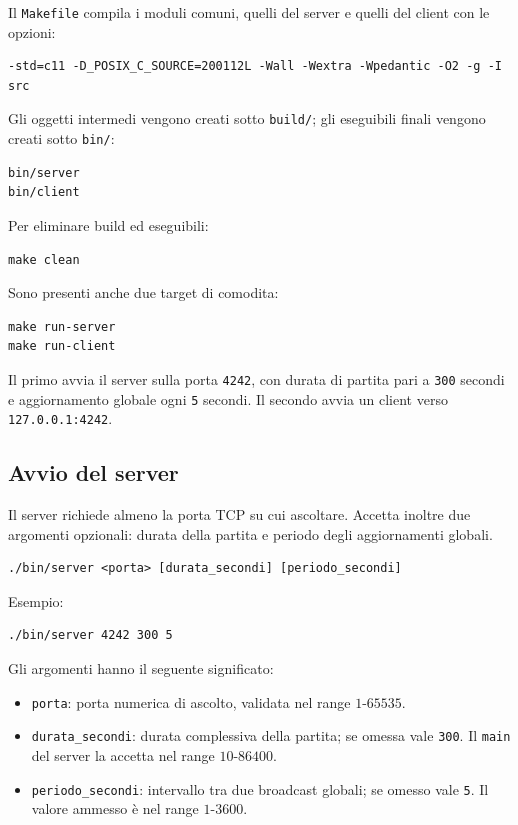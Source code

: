 \documentclass[11pt,a4paper]{article}
\begin{document}
Il \texttt{Makefile} compila i moduli comuni, quelli del server e quelli del client con le opzioni:

\begin{lstlisting}[style=textstyle]
-std=c11 -D_POSIX_C_SOURCE=200112L -Wall -Wextra -Wpedantic -O2 -g -I src
\end{lstlisting}

Gli oggetti intermedi vengono creati sotto \texttt{build/}; gli eseguibili finali vengono creati sotto \texttt{bin/}:

\begin{lstlisting}[style=textstyle]
bin/server
bin/client
\end{lstlisting}
\newpage
Per eliminare build ed eseguibili:

\begin{lstlisting}[style=textstyle]
make clean
\end{lstlisting}

Sono presenti anche due target di comodita:

\begin{lstlisting}[style=textstyle]
make run-server
make run-client
\end{lstlisting}

Il primo avvia il server sulla porta \texttt{4242}, con durata di partita pari a \texttt{300} secondi e aggiornamento globale ogni \texttt{5} secondi. Il secondo avvia un client verso \texttt{127.0.0.1:4242}.

\subsection{Avvio del server}

Il server richiede almeno la porta TCP su cui ascoltare. Accetta inoltre due argomenti opzionali: durata della partita e periodo degli aggiornamenti globali.

\begin{lstlisting}[style=textstyle]
./bin/server <porta> [durata_secondi] [periodo_secondi]
\end{lstlisting}

Esempio:

\begin{lstlisting}[style=textstyle]
./bin/server 4242 300 5
\end{lstlisting}

Gli argomenti hanno il seguente significato:

\begin{itemize}
  \item \texttt{porta}: porta numerica di ascolto, validata nel range \(1\)-\(65535\).
  \item \texttt{durata\_secondi}: durata complessiva della partita; se omessa vale \texttt{300}. Il \texttt{main} del server la accetta nel range \(10\)-\(86400\).
  \item \texttt{periodo\_secondi}: intervallo tra due broadcast globali; se omesso vale \texttt{5}. Il valore ammesso è nel range \(1\)-\(3600\).
\end{itemize}
\end{document}
